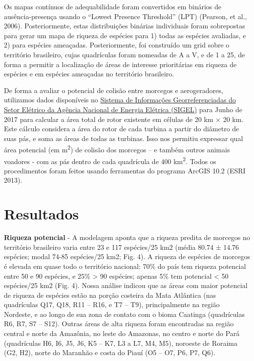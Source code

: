 \documentclass[
]{scrbook}
\begin{document}
Os mapas contínuos de adequabilidade foram convertidos em binários de ausência-presença usando o ``Lowest Presence Threshold'' (LPT) (Pearson, et al., 2006). Posteriormente, estas distribuições binárias individuais foram sobrepostas para gerar um mapa de riqueza de espécies para 1) todas as espécies avaliadas, e 2) para espécies ameaçadas. Posteriormente, foi construído um grid sobre o território brasileiro, cujas quadrículas foram nomeadas de A a V, e de 1 a 25, de forma a permitir a localização de áreas de interesse prioritárias em riqueza de espécies e em espécies ameaçadas no território brasileiro.

De forma a avaliar o potencial de colisão entre morcegos e aerogeradores, utilizamos dados disponíveis no \href{http://sigel.aneel.gov.br/sigel.html}{Sistema de Informações Georreferenciadas do Setor Elétrico da Agência Nacional de Energia Elétrica (SIGEL)} para Junho de 2017 para calcular a área total de rotor existente em células de 20 km × 20 km. Este cálculo considera a área do rotor de cada turbina a partir do diâmetro de suas pás, e soma as áreas de todas as turbinas. Isso nos permitiu expressar qual área potencial (em m\textsuperscript{2}) de colisão dos morcegos -- e também outros animais voadores - com as pás dentro de cada quadrícula de 400 km\textsuperscript{2}. Todos os procedimentos foram feitos usando ferramentas do programa ArcGIS 10.2 (ESRI 2013).

\hypertarget{resultados-morcegos}{%
\section{Resultados}\label{resultados-morcegos}}

\textbf{Riqueza potencial} - A modelagem aponta que a riqueza predita de morcegos no território brasileiro varia entre 23 e 117 espécies/25 km2 (média 80.74 ± 14.76 espécies; modal 74-85 espécies/25 km2; Fig. 4). A riqueza de espécies de morcegos é elevada em quase todo o território nacional: 70\% do país tem riqueza potencial entre 50 e 90 espécies, e 25\% \textgreater{} 90 espécies; apenas 5\% tem potencial \textless{} 50 espécies/25 km2 (Fig. 4). Nossa análise indicou que as áreas com maior potencial de riqueza de espécies estão na porção costeira da Mata Atlântica (nas quadrículas Q17, Q18, R11 -- R16, e T7 -- T9), principalmente na região Nordeste, e ao longo de sua zona de contato com o bioma Caatinga (quadrículas R6, R7, S7 -- S12). Outras áreas de alta riqueza foram encontradas na região central e norte da Amazônia, no leste do Amazonas, no centro e norte do Pará (quadrículas H6, I6, J5, J6, K5 -- K7, L3 a L7, M4, M5), noroeste de Roraima (G2, H2), norte do Maranhão e costa do Piauí (O5 -- O7, P6, P7, Q6).
\end{document}
